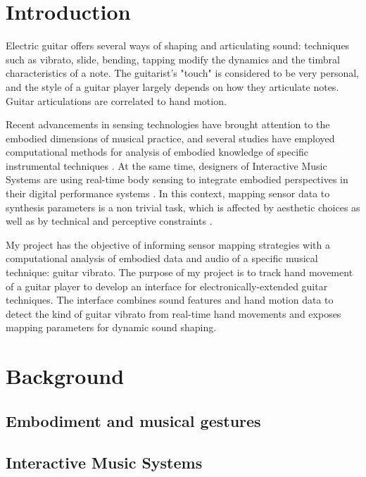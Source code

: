 \documentclass{nime-alternate} %
\begin{document}
\printccsdesc


\section{Introduction}
Electric guitar offers several ways of shaping and articulating sound: techniques such as vibrato, slide, bending, tapping modify the dynamics and the timbral characteristics of a note. The guitarist's "touch" is considered to be very personal, and the style of a guitar player largely depends on how they articulate notes. Guitar articulations are correlated to hand motion.

Recent advancements in sensing technologies have brought attention to the embodied dimensions of musical practice, and several studies have employed computational methods for analysis of embodied knowledge of specific instrumental techniques \cite{article, inbook, Schyff}. At the same time, designers of Interactive Music Systems are using real-time body sensing to integrate embodied perspectives in their digital performance systems \cite{jensenius_gestures_2021, miranda_interactive_2021}. In this context, mapping sensor data to synthesis parameters is a non trivial task, which is affected by aesthetic choices as well as by technical and perceptive constraints \cite{strauss_extensible_2023, van_nort_mapping_2014}.

My project has the objective of informing sensor mapping strategies with a computational analysis of embodied data and audio of a specific musical technique: guitar vibrato. The purpose of my project is to track hand movement of a guitar player to develop an interface for electronically-extended guitar techniques. The interface combines sound features and hand motion data to detect the kind of guitar vibrato from real-time hand movements and exposes mapping parameters for dynamic sound shaping.



\section{Background}
\subsection{Embodiment and musical gestures}
\subsection{Interactive Music Systems}
\end{document}
